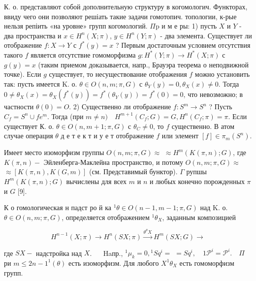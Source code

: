 \documentclass[10pt]{article}
\begin{document}
К. о. представляют собой дополнительную структуру в когомологич. Функторах, ввиду чего они позволяют решіать такие задачи гомотопич. топологии, к-рые нельзя репіить «на уровне» групп когомологий. $\Pi \mathrm{p}$ и м е ры: 1) пусть $X$ и $Y$ - два пространства и $x \in H^{n}(X ; \pi)$, $y \in H^{n}(Y ; \pi)$ - два элемента. Существует ли отображение $f: X \rightarrow Y$ с $f^{*}(y)=x$ ? Первым достаточным условием отсутствия такого $f$ является отсутствие гомоморфизма $g: H^{*}(Y ; \pi) \rightarrow H^{*}(X ; \pi)$ с $g(y)=x$ (таким приемом доказывается, напр., Брауэра теорема о неподвижной точке). Если $g$ существует, то несуществование отображения $f$ можно установить так: пусть имеется $\mathrm{K}$. о. $\theta \in O(n, m ; \pi, G)$ с $\theta_{Y}(y)=0, \theta_{X}(x) \neq 0$. Тогда $0 \neq \theta_{X}(x)=\theta_{X}\left(f^{*}(y)\right)=f^{*}\left(\theta_{Y}(y)\right)=f^{*}(0)=0$, что невозможно; в частности $\theta(0)=O$. 2) Существенно ли отображение $f: S^{m} \rightarrow S^{n}$ ? Пусть $C_{f}=S^{n} \cup f e^{m}$. Тогда (при $m \neq n) \quad H^{m+1}\left(C_{f} ; G\right)=G, H^{n}\left(C_{f} ; \pi\right)=\pi$. Если существует К. о. $\theta \in O(n, m+1 ; \pi, G)$ с $\theta_{C} \neq 0$, то $f$ существенно. В атом случае операция $\theta$ д е т е к т и у е т отображение $f$ или элемент $[f] \in \pi_{m}\left(S^{n}\right)$.



Имеет место изоморфизм группы $O(n, m ; \pi, G) \approx$ $\approx H^{m}(K(\pi, n) ; G)$, где $K(\pi, n)-$ Эйленберга-Маклейна пространство, и потому $O(n, m ; \pi, G) \approx$ $\approx[K(\pi, n), K(G, m)]$ (см. Представимый бунктор). $\Gamma$ рупшы $H^{m}(K(\pi, n) ; G)$ вычислены для всех $m$ и $n$ и любых конечно порожденных $\pi$ и $G$ [9].



К о гомологическая н падст ро й ка ${ }^{1} \theta \in O(n-1, m-1 ; \pi, G)$ над K. о. $\theta \in O(n, m ; \pi, G)$, определяется отображением ${ }^{1} \theta_{X}$, заданным композицией



\[

H^{n-1}(X ; \pi) \longrightarrow H^{n}(S X ; \pi) \stackrel{\theta^{\theta} X}{\longrightarrow} H^{m}(S X ; G) \longrightarrow

\]



где $S X-$ надстройка над $X$. $\quad$ Haпр., ${ }^{1} \mu_{k}=0,{ }^{1} S q^{i}=$ $=S q^{i}, \quad 1 \mathscr{P}^{i}=\mathscr{P}^{i} . \quad \Pi$ ри $m \leqslant 2 n-1^{1}(\theta)$ есть изоморфизм. Для любого $X^{1} \theta_{X}$ есть гомоморфизм групп.
\end{document}
